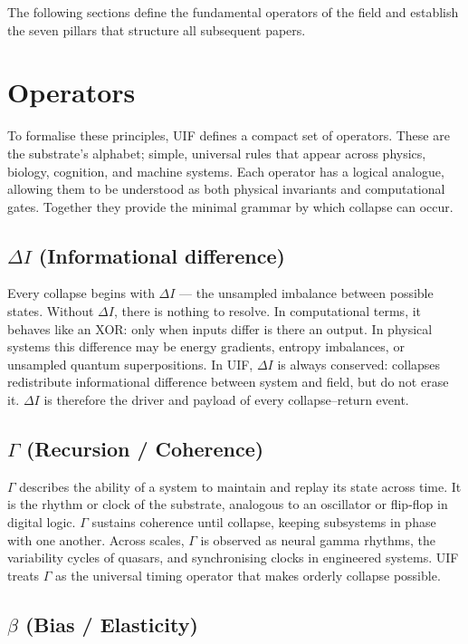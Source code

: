 \noindent The following sections define the fundamental operators of the field and establish the seven pillars that structure all subsequent papers.

\section{Operators}

To formalise these principles, UIF defines a compact set of operators. These are the substrate’s alphabet; simple, universal rules that appear across physics, biology, cognition, and machine systems. Each operator has a logical analogue, allowing them to be understood as both physical invariants and computational gates. Together they provide the minimal grammar by which collapse can occur.

\subsection{$\Delta I$ (Informational difference)}

Every collapse begins with $\Delta I$ --- the unsampled imbalance between possible states. Without $\Delta I$, there is nothing to resolve. In computational terms, it behaves like an XOR: only when inputs differ is there an output. In physical systems this difference may be energy gradients, entropy imbalances, or unsampled quantum superpositions. In UIF, $\Delta I$ is always conserved: collapses redistribute informational difference between system and field, but do not erase it. $\Delta I$ is therefore the driver and payload of every collapse--return event.

\subsection{$\Gamma$ (Recursion / Coherence)}

$\Gamma$ describes the ability of a system to maintain and replay its state across time. It is the rhythm or clock of the substrate, analogous to an oscillator or flip-flop in digital logic. $\Gamma$ sustains coherence until collapse, keeping subsystems in phase with one another. Across scales, $\Gamma$ is observed as neural gamma rhythms, the variability cycles of quasars, and synchronising clocks in engineered systems. UIF treats $\Gamma$ as the universal timing operator that makes orderly collapse possible.

\subsection{$\beta$ (Bias / Elasticity)}


